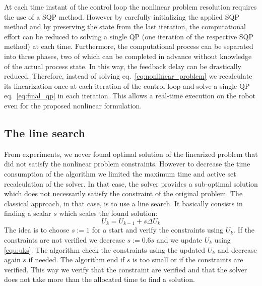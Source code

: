 At each time instant of the control loop the nonlinear problem resolution requires the use of a SQP method.
However by carefully initializing the applied SQP method and by preserving the state from the last iteration, the computational effort can be reduced to solving a single QP (one iteration of the respective SQP method) at each time. Furthermore, the computational process can be separated into three phases, two of which can be completed in advance without knowledge of the actual process state. In this way, the feedback delay can be drastically reduced.
Therefore, instead of solving eq.~\eqref{eq:nonlinear_problem} we recalculate its linearization once at each iteration of the control loop and solve a single QP eq.~\eqref{eq:final_qp} in each iteration.
This allows a real-time execution on the robot even for the proposed nonlinear formulation.

\subsection{The line search}
\label{sec:linesearch}

From experiments, we never found optimal solution of the linearized problem that did not satisfy the nonlinear problem constraints.
However to decrease the time consumption of the algorithm we limited the maximum time and active set recalculation of the solver.
In that case, the solver provides a sub-optimal solution which does not necessarily satisfy the constraint of the original problem.
The classical approach, in that case, is to use a line search.
It basically consists in finding a scalar $s$ which scales the found solution:
\begin{equation}
U_k = U_{k-1} + s \Delta U_k
\label{equ:uks}
\end{equation}
The idea is to choose $s:=1$ for a start and verify the constraints using $U_k$.
If the constraints are not verified we decrease $s:=0.6s$ and we update $U_k$ using \ref{equ:uks}.
The algorithm check the constraints using the updated $U_k$ and decrease again $s$ if needed.
The algorithm end if $s$ is too small or if the constraints are verified.
This way we verify that the constraint are verified and that the solver does not take more than the allocated time to find a solution.

